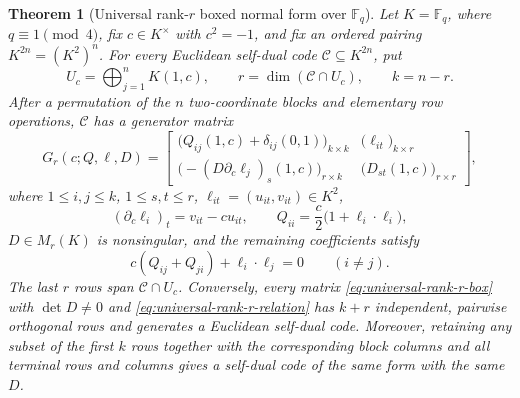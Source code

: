 \documentclass[10pt,a4paper]{amsart}
\newtheorem{theorem}{Theorem}
\newcommand{\F}{\mathbb{F}}
\begin{document}
\begin{theorem}[Universal rank-\(r\) boxed normal form over
\texorpdfstring{$\F_q$}{Fq}]
\label{thm:qary-universal-rank-r}
Let \(K=\F_q\), where \(q\equiv1\pmod4\), fix \(c\in K^\times\) with
\(c^2=-1\), and fix an ordered pairing \(K^{2n}=(K^2)^n\).  For every
Euclidean self-dual code \(\mathcal C\subseteq K^{2n}\), put
\[
 U_c=\bigoplus_{j=1}^n K(1,c),\qquad
 r=\dim(\mathcal C\cap U_c),\qquad k=n-r.
\]
After a permutation of the \(n\) two-coordinate blocks and elementary row
operations, \(\mathcal C\) has a generator matrix
\begin{equation}
G_r(c;Q,\ell,D)=
\left[
\begin{array}{c|c}
\bigl(Q_{ij}(1,c)+\delta_{ij}(0,1)\bigr)_{k\times k}
  & \bigl(\ell_{it}\bigr)_{k\times r}\\ \hline
\bigl(-(D\partial_c\ell_j)_s(1,c)\bigr)_{r\times k}
  & \bigl(D_{st}(1,c)\bigr)_{r\times r}
\end{array}
\right],
\label{eq:universal-rank-r-box}
\end{equation}
where \(1\le i,j\le k\), \(1\le s,t\le r\),
\(\ell_{it}=(u_{it},v_{it})\in K^2\),
\[
 (\partial_c\ell_i)_t=v_{it}-cu_{it},\qquad
 Q_{ii}=\frac c2\bigl(1+\ell_i\cdot\ell_i\bigr),
\]
\(D\in M_r(K)\) is nonsingular, and the remaining coefficients satisfy
\begin{equation}
 c(Q_{ij}+Q_{ji})+\ell_i\cdot\ell_j=0
\qquad(i\ne j).
\label{eq:universal-rank-r-relation}
\end{equation}
The last \(r\) rows span \(\mathcal C\cap U_c\).  Conversely, every matrix
\eqref{eq:universal-rank-r-box} with \(\det D\ne0\) and
\eqref{eq:universal-rank-r-relation} has \(k+r\) independent, pairwise
orthogonal rows and generates a Euclidean self-dual code.  Moreover,
retaining any subset of the first \(k\) rows together with the corresponding
block columns and all terminal rows and columns gives a self-dual code of
the same form with the same \(D\).
\end{theorem}
\end{document}
